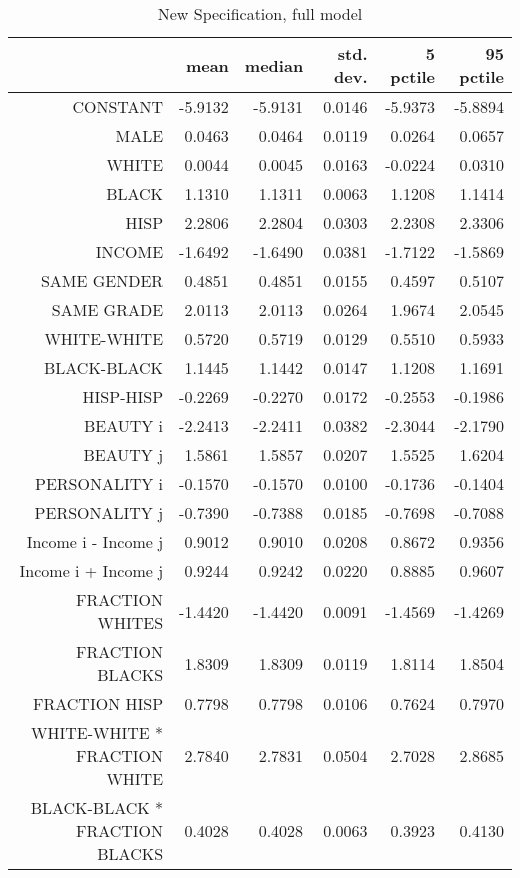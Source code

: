 \begin{table}[ht]
\caption{New Specification, full model}
\centering
\begin{tabular}{rrrrrr}
  \hline
 & mean & median & std. dev. & 5 pctile & 95 pctile \\ 
  \hline
CONSTANT & -5.9132 & -5.9131 & 0.0146 & -5.9373 & -5.8894 \\ 
  MALE & 0.0463 & 0.0464 & 0.0119 & 0.0264 & 0.0657 \\ 
  WHITE & 0.0044 & 0.0045 & 0.0163 & -0.0224 & 0.0310 \\ 
  BLACK & 1.1310 & 1.1311 & 0.0063 & 1.1208 & 1.1414 \\ 
  HISP & 2.2806 & 2.2804 & 0.0303 & 2.2308 & 2.3306 \\ 
  INCOME & -1.6492 & -1.6490 & 0.0381 & -1.7122 & -1.5869 \\ 
  SAME GENDER & 0.4851 & 0.4851 & 0.0155 & 0.4597 & 0.5107 \\ 
  SAME GRADE & 2.0113 & 2.0113 & 0.0264 & 1.9674 & 2.0545 \\ 
  WHITE-WHITE & 0.5720 & 0.5719 & 0.0129 & 0.5510 & 0.5933 \\ 
  BLACK-BLACK & 1.1445 & 1.1442 & 0.0147 & 1.1208 & 1.1691 \\ 
  HISP-HISP & -0.2269 & -0.2270 & 0.0172 & -0.2553 & -0.1986 \\ 
  BEAUTY i & -2.2413 & -2.2411 & 0.0382 & -2.3044 & -2.1790 \\ 
  BEAUTY j & 1.5861 & 1.5857 & 0.0207 & 1.5525 & 1.6204 \\ 
  PERSONALITY i & -0.1570 & -0.1570 & 0.0100 & -0.1736 & -0.1404 \\ 
  PERSONALITY j & -0.7390 & -0.7388 & 0.0185 & -0.7698 & -0.7088 \\ 
  Income i - Income j & 0.9012 & 0.9010 & 0.0208 & 0.8672 & 0.9356 \\ 
  Income i + Income j & 0.9244 & 0.9242 & 0.0220 & 0.8885 & 0.9607 \\ 
  FRACTION WHITES & -1.4420 & -1.4420 & 0.0091 & -1.4569 & -1.4269 \\ 
  FRACTION BLACKS & 1.8309 & 1.8309 & 0.0119 & 1.8114 & 1.8504 \\ 
  FRACTION HISP & 0.7798 & 0.7798 & 0.0106 & 0.7624 & 0.7970 \\ 
  WHITE-WHITE * FRACTION WHITE & 2.7840 & 2.7831 & 0.0504 & 2.7028 & 2.8685 \\ 
  BLACK-BLACK * FRACTION BLACKS & 0.4028 & 0.4028 & 0.0063 & 0.3923 & 0.4130 \\ 

\end{tabular}
\end{table}
